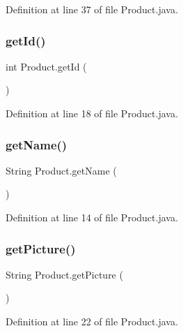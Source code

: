 Definition at line 37 of file Product.\+java.

\mbox{\label{class_product_a7defaa7ccf44eaade9c514f73a8c16b0}} 
\subsubsection{\texorpdfstring{getId()}{getId()}}
{\footnotesize\ttfamily int Product.\+get\+Id (\begin{DoxyParamCaption}{ }\end{DoxyParamCaption})}



Definition at line 18 of file Product.\+java.

\mbox{\label{class_product_a7cd7a5ab2efcd0a3214e1e7928006e1a}} 
\subsubsection{\texorpdfstring{getName()}{getName()}}
{\footnotesize\ttfamily String Product.\+get\+Name (\begin{DoxyParamCaption}{ }\end{DoxyParamCaption})}



Definition at line 14 of file Product.\+java.

\mbox{\label{class_product_a5fdebffb244aadcbc3de652976af1b7d}} 
\subsubsection{\texorpdfstring{getPicture()}{getPicture()}}
{\footnotesize\ttfamily String Product.\+get\+Picture (\begin{DoxyParamCaption}{ }\end{DoxyParamCaption})}



Definition at line 22 of file Product.\+java.

\mbox{\label{class_product_acd98d30d99facb52c93b64783e90c7a8}} 
